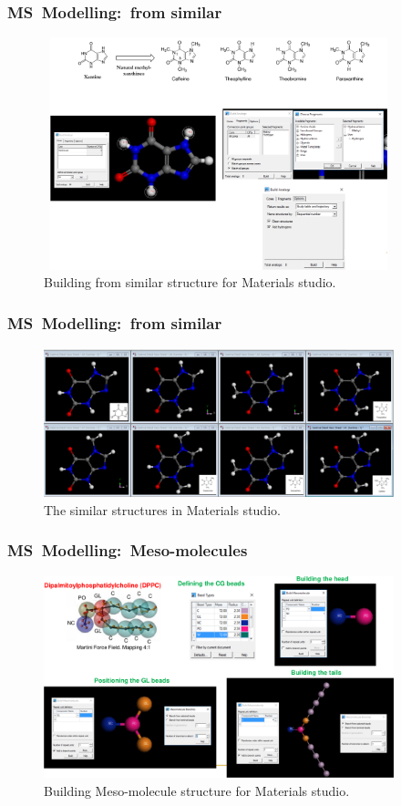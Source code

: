\frame
{
	\frametitle{\textrm{MS~Modelling:~from similar}}
\begin{figure}[h!]
\centering
\vspace*{-0.16in}
\includegraphics[height=2.65in,width=4.00in,viewport=0 0 1150 800,clip]{Figures/MS-Building_Analogs.png}
\caption{\tiny \textrm{Building from similar structure for Materials studio.}}%
\label{MS-Building_analogs}
\end{figure}
}

\frame
{
	\frametitle{\textrm{MS~Modelling:~from similar}}
\begin{figure}[h!]
\centering
\includegraphics[height=1.70in,width=4.00in,viewport=0 0 1225 517,clip]{Figures/MS-Building_Analogs-examples.png}
\caption{\tiny \textrm{The similar structures in Materials studio.}}%
\label{MS-Building_analogs-examples}
\end{figure}
}

\frame
{
	\frametitle{\textrm{MS~Modelling:~Meso-molecules}}
\begin{figure}[h!]
\centering
\vspace*{-0.12in}
\includegraphics[height=2.31in,width=4.00in,viewport=0 0 1275 735,clip]{Figures/MS-Building_Mesomolecule.png}
\caption{\tiny \textrm{Building Meso-molecule structure for Materials studio.}}%
\label{MS-Building_Meso-molecules}
\end{figure}
}

